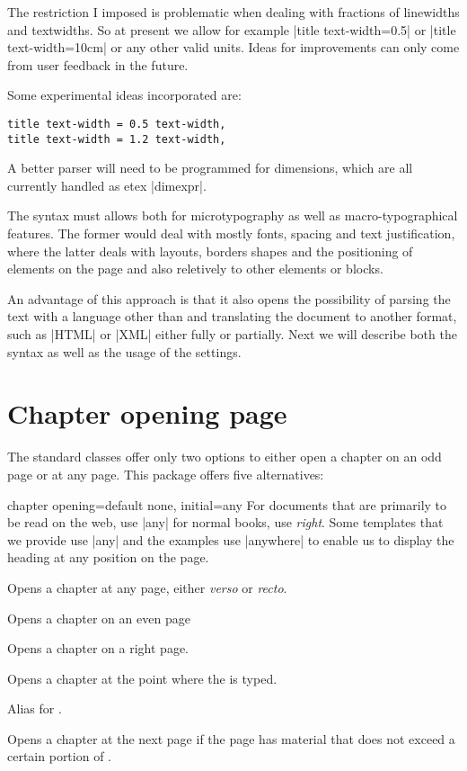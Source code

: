The restriction I imposed is problematic when dealing with fractions of linewidths and textwidths. So
at present we allow for example |title text-width=0.5\texwidth| or |title text-width=10cm| or any other valid units. Ideas for improvements can only come from user feedback in the future.

Some experimental ideas incorporated are:

\begin{verbatim}
title text-width = 0.5 text-width,
title text-width = 1.2 text-width,
\end{verbatim}

A better parser will need to be programmed for dimensions, which are all currently handled as etex |dimexpr|. 

The syntax must allows both for microtypography as well as macro-typographical features. The former would deal with mostly fonts, spacing and text justification, where the latter deals with layouts, borders shapes and the positioning of elements on the page and also reletively to other elements or blocks.

An advantage of this approach is that it also opens the possibility of parsing the text with a language other than \tex and translating the document to another format, such as |HTML| or |XML| either fully or partially. Next we will describe both the syntax as well as the usage of the settings.

\section{Chapter opening page}

The standard \latexe classes offer only two options to either open a chapter on an odd page or at any page. This package offers five alternatives:

\begin{docKey}[phd]{chapter opening}{=}{default none, initial=any}
For documents that are primarily to be read on the web, use |any| for normal books, use \textit{right}. Some templates that we provide use |any| and the examples use |anywhere| to enable us to display the heading at any position on the page.
\end{docKey}

\begin{marglist}
\item [any] Opens a chapter at any page, either \textit{verso} or \textit{recto}.
\item [left] Opens a chapter on an even page
\item [right] Opens a chapter on a right page.
\item [anywhere] Opens a chapter at the point where the  is typed.
\item [none] Alias for .
\item [ifafter] Opens a chapter at the next page if the page has material that does not exceed a certain portion of .
\end{marglist}

